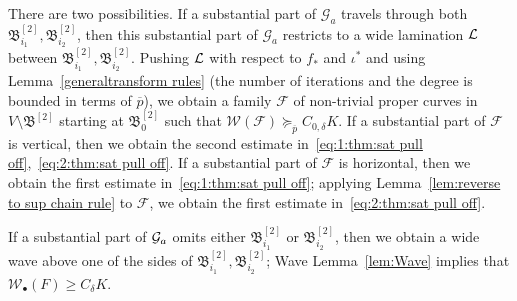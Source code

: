 \documentclass{amsart}
\newcommand{\bush}{{\mathfrak B }}
\newcommand{\bbush}{{\boldsymbol {\mathfrak B} }}
\newcommand{\1}{{\mathbb 1 }}
\newcommand{\Fam}{{\mathcal F}}
\newcommand{\FamG}{{\mathcal G}}
\newcommand{\Width}{{\mathcal W}}
\begin{document}
There are two possibilities. If a substantial part of $\FamG_a$ travels through both $\bush^{[2]}_{i_1}, \bush^{[2]}_{i_2}$, then this substantial part of  $\FamG_a$ restricts to a wide lamination ${\mathcal L}$  between $\bush^{[2]}_{i_1}, \bush^{[2]}_{i_2}$. Pushing ${\mathcal L}$ with respect to $f_*$ and $\iota^*$ and using Lemma~\ref{generaltransform rules} (the number of iterations and the degree is bounded in terms of $\overline p$), we obtain a family $\Fam$ of non-trivial proper curves in $V\setminus \bbush^{[2]}$ starting at $\bush^{[2]}_0$ such that $\Width(\Fam)\succeq_{\overline p}  C_{0,\delta} K$. If a substantial part of $\Fam$ is vertical, then we obtain the second estimate in~\eqref{eq:1:thm:sat pull off},~\eqref{eq:2:thm:sat pull off}. If a substantial part of $\Fam$ is horizontal, then we obtain the first estimate in~\eqref{eq:1:thm:sat pull off}; applying Lemma~\ref{lem:reverse to sup chain rule} to $\Fam$, we obtain the first estimate in~\eqref{eq:2:thm:sat pull off}. 



If a substantial part of ${\mathcal G}_a$ omits either $\bush^{[2]}_{i_1}$ or $\bush^{[2]}_{i_2}$, then we obtain a wide wave above one of the sides of $\bush^{[2]}_{i_1}, \bush^{[2]}_{i_2}$; Wave Lemma~\ref{lem:Wave} implies that $\Width_\bullet(F)\ge C_\delta K$.
\end{document}
